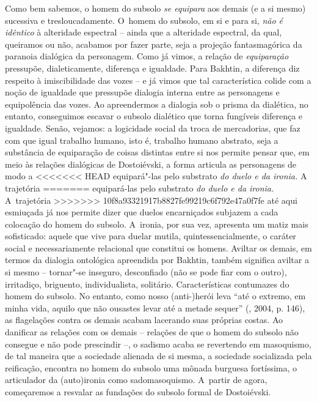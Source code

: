 {Como bem sabemos, o homem do subsolo \emph{se equipara} aos demais (e a
si mesmo) sucessiva e tresloucadamente. O~homem do subsolo, em si e para
si, \emph{não é idêntico} à alteridade espectral -- ainda que a
alteridade espectral, da qual, queiramos ou não, acabamos por fazer
parte, seja a projeção fantasmagórica da paranoia dialógica da
personagem. Como já vimos, a relação de \emph{equiparação} pressupõe,
dialeticamente, diferença e igualdade. Para Bakhtin, a diferença diz
respeito à imiscibilidade das vozes -- e já vimos que tal característica
colide com a noção de igualdade que pressupõe dialogia interna entre as
personagens e equipolência das vozes. Ao apreendermos a dialogia sob o
prisma da dialética, no entanto, conseguimos escavar o subsolo dialético
que torna fungíveis diferença e igualdade. Senão, vejamos: a logicidade
social da troca de mercadorias, que faz com que igual trabalho humano,
isto é, trabalho humano abstrato, seja a substância de equiparação de
coisas distintas entre si nos permite pensar que, em meio às relações
dialógicas de Dostoiévski, a forma articula as personagens de modo a
<<<<<<< HEAD
equipará"-las pelo substrato \emph{do duelo e da ironia.} A trajetória
=======
equipará-las pelo substrato \emph{do duelo e da ironia.} A~trajetória
>>>>>>> 10f8a93321917b8827fe99219c6f792e47a0f7fe
até aqui esmiuçada já nos permite dizer que duelos encarniçados subjazem
a cada colocação do homem do subsolo. A~ironia, por sua vez, apresenta
um matiz mais sofisticado: aquele que vive para duelar mutila,
quintessencialmente, o caráter social e necessariamente relacional que
constitui os homens. Aviltar os demais, em termos da dialogia ontológica
apreendida por Bakhtin, também significa aviltar a si mesmo -- tornar"-se
inseguro, desconfiado (não se pode fiar com o outro), irritadiço,
briguento, individualista, solitário. Características contumazes do
homem do subsolo. No entanto, como nosso (anti-)herói leva ``até o
extremo, em minha vida, aquilo que não ousastes levar até a metade
sequer'' (, 2004, p. 146), as flagelações contra os demais
acabam lacerando suas próprias costas. Ao danificar as relações com os
demais -- relações de que o homem do subsolo não consegue e não pode
prescindir --, o sadismo acaba se revertendo em masoquismo, de tal
maneira que a sociedade alienada de si mesma, a sociedade socializada
pela reificação, encontra no homem do subsolo uma mônada burguesa
fortíssima, o articulador da (auto)ironia como sadomasoquismo. A~partir
de agora, começaremos a resvalar as fundações do subsolo formal de
Dostoiévski.

}
